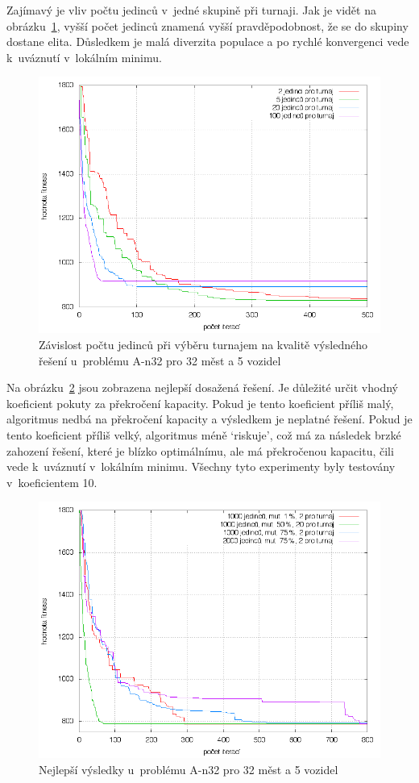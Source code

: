 \documentclass[a4paper]{article}
\begin{document}
Zajímavý je vliv počtu jedinců v~jedné skupině při turnaji. Jak je vidět na obrázku~\ref{fig:turnaj}, vyšší počet jedinců znamená vyšší pravděpodobnost, že se do skupiny dostane elita. Důsledkem je malá diverzita populace a po rychlé konvergenci vede k~uváznutí v~lokálním minimu.

\begin{figure}
\centering
\includegraphics[width=\textwidth]{turnaj.png}
\caption{Závislost počtu jedinců při výběru turnajem na kvalitě výsledného řešení u~problému A-n32 pro 32 měst a 5 vozidel\label{fig:turnaj}}
\end{figure}

Na obrázku~\ref{fig:best} jsou zobrazena nejlepší dosažená řešení. Je důležité určit vhodný koeficient pokuty za překročení kapacity. Pokud je tento koeficient příliš malý, algoritmus nedbá na překročení kapacity a výsledkem je neplatné řešení. Pokud je tento koeficient příliš velký, algoritmus méně `riskuje', což má za následek brzké zahození řešení, které je blízko optimálnímu, ale má překročenou kapacitu, čili vede k~uváznutí v~lokálním minimu. Všechny tyto experimenty byly testovány v~koeficientem 10.

\begin{figure}
\centering
\includegraphics[width=\textwidth]{best.png}
\caption{Nejlepší výsledky u~problému A-n32 pro 32 měst a 5 vozidel\label{fig:best}}
\end{figure}
\end{document}

